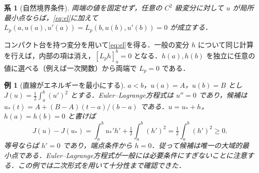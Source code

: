 \documentclass[a5paper,10pt,onecolumn]{jsarticle}
\makeatletter
\theoremstyle{mathnotetheorem}
\newtheorem{corollary}[theorem]{系}
\newtheorem{example}[theorem]{例}
\renewcommand{\proofname}{証明}
\renewenvironment{proof}[1][\proofname]{%
  \par\pushQED{\qed}\normalfont\topsep4\p@\@plus2\p@\relax
  \trivlist\item[\hskip\labelsep\bfseries #1]\ignorespaces
}{\popQED\endtrivlist\@endpefalse}
\makeatother
\begin{document}
\begin{corollary}[自然境界条件]
両端の値を固定せず，任意の $C^2$ 級変分に対して $u$ が局所最小点ならば，\eqref{eq:el}に加えて $L_p(a,u(a),u'(a))=L_p(b,u(b),u'(b))=0$ が成立する．
\end{corollary}
\begin{proof}
コンパクト台を持つ変分を用いて\eqref{eq:el}を得る．一般の変分 $h$ について同じ計算を行えば，内部の項は消え，$[L_p h]_a^b=0$ となる．$h(a),h(b)$ を独立に任意の値に選べる（例えば一次関数）から両端で $L_p=0$ である．
\end{proof}
\begin{example}[直線がエネルギーを最小にする]
$a<b$，$u(a)=A$，$u(b)=B$ とし $J(u)=\frac12\int_a^b (u')^2$ とする．Euler--Lagrange方程式は $u''=0$ であり，候補は $u_*(t)=A+(B-A)(t-a)/(b-a)$ である．$u=u_*+h$，$h(a)=h(b)=0$ と書けば
\[
 J(u)-J(u_*)=\int_a^b u_*'h'+\tfrac12\int_a^b(h')^2
 =\tfrac12\int_a^b(h')^2\ge0.
\]
等号ならば $h'=0$ であり，端点条件から $h=0$．従って候補は唯一の大域的最小点である．Euler--Lagrange方程式が一般には必要条件にすぎないことに注意する．この例では二次形式を用いて十分性まで確認できた．
\end{example}
\end{document}
